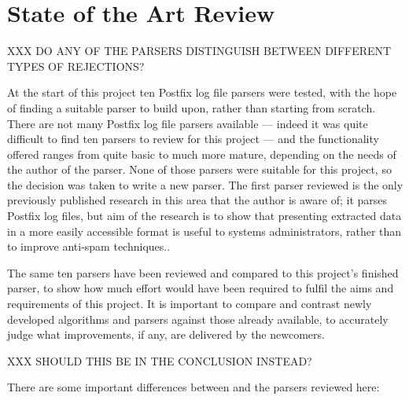 \chapter{State of the Art Review}

\label{state of the art review}

XXX DO ANY OF THE PARSERS DISTINGUISH BETWEEN DIFFERENT TYPES OF
REJECTIONS\@?

At the start of this project ten Postfix log file parsers were tested, with
the hope of finding a suitable parser to build upon, rather than starting
from scratch.  There are not many Postfix log file parsers available ---
indeed it was quite difficult to find ten parsers to review for this
project --- and the functionality offered ranges from quite basic to much
more mature, depending on the needs of the author of the parser.  None of
those parsers were suitable for this project, so the decision was taken to
write a new parser.  The first parser reviewed is the only previously
published research in this area that the author is aware of; it parses
Postfix log files, but aim of the research is to show that presenting
extracted data in a more easily accessible format is useful to systems
administrators, rather than to improve anti-spam techniques..

The same ten parsers have been reviewed and compared to this project's
finished parser, to show how much effort would have been required to fulfil
the aims and requirements of this project.  It is important to compare and
contrast newly developed algorithms and parsers against those already
available, to accurately judge what improvements, if any, are delivered by
the newcomers.

XXX SHOULD THIS BE IN THE CONCLUSION INSTEAD\@?

There are some important differences between \parsername{} and the parsers
reviewed here:

